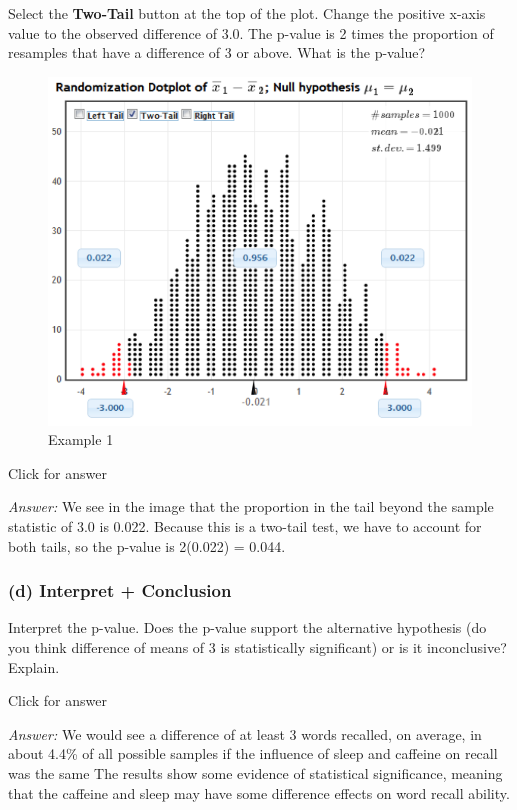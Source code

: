 \documentclass[
]{book}
\begin{document}
Select the \textbf{Two-Tail} button at the top of the plot. Change the positive x-axis value to the observed difference of 3.0. The p-value is 2 times the proportion of resamples that have a difference of 3 or above. What is the p-value?

\begin{figure}
\centering
\includegraphics{data/wordRand.png}
\caption{Example 1}
\end{figure}

Click for answer

\emph{Answer:} We see in the image that the proportion in the tail beyond the sample statistic of 3.0 is 0.022. Because this is a two-tail test, we have to account for both tails, so the p-value is 2(0.022) = 0.044.

\hypertarget{d-interpret-conclusion}{%
\subsubsection{(d) Interpret + Conclusion}\label{d-interpret-conclusion}}

Interpret the p-value. Does the p-value support the alternative hypothesis (do you think difference of means of 3 is statistically significant) or is it inconclusive? Explain.

Click for answer

\emph{Answer:} We would see a difference of at least 3 words recalled, on average, in about 4.4\% of all possible samples if the influence of sleep and caffeine on recall was the same The results show some evidence of statistical significance, meaning that the caffeine and sleep may have some difference effects on word recall ability.
\end{document}
